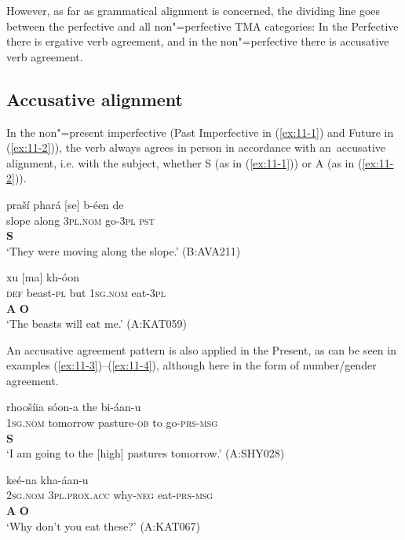 However, as far as grammatical alignment is concerned, the dividing line goes between the perfective and all non"=perfective TMA categories: In the Perfective there is ergative verb agreement, and in the non"=perfective there is accusative verb agreement. 


\subsection{Accusative alignment}
\label{subsec:11-1-1}


In the non"=present imperfective (Past Imperfective in (\ref{ex:11-1}) and Future in (\ref{ex:11-2})), the verb always agrees in person in accordance with an~accusative alignment, i.e. with the subject, whether S (as in (\ref{ex:11-1})) or A (as in (\ref{ex:11-2})). 

\begin{exe}
\ex
\label{ex:11-1}
\glll praší phará [se] b-éen de \\
slope along \textsc{3pl.nom} go-\textsc{3pl} \textsc{pst} \\
{} {}  \textbf{S} \\
\glt `They were moving along the slope.' (B:AVA211)

\ex
\label{ex:11-2}
 xu [ma] kh-óon \\
\textsc{def} beast-\textsc{pl} but \textsc{1sg.nom} eat-\textsc{3pl} \\
 \textbf{A} {} {}  \textbf{O} \\
\glt `The beasts will eat me.' (A:KAT059)
\end{exe}

An accusative agreement pattern is also applied in the Present, as can be seen in examples (\ref{ex:11-3})--(\ref{ex:11-4}), although here in the form of number/gender agreement.

\begin{exe}
\ex
\label{ex:11-3}
\glll [ma] rhoošíia sóon-a the bi-áan-u \\
\textsc{1sg.nom} tomorrow pasture-\textsc{ob} to go-\textsc{prs-}\textsc{msg} \\
\textbf{S} \\
\glt `I am going to the [high] pastures tomorrow.' (A:SHY028)

\ex
\label{ex:11-4}
\glll [tu] [aniaám] keé-na kha-áan-u \\
\textsc{2sg.nom} \textsc{3pl.prox.acc} why-\textsc{neg} eat-\textsc{prs-}\textsc{msg} \\
\textbf{A} \textbf{O} \\
\glt `Why don't you eat these?' (A:KAT067)
\end{exe}

